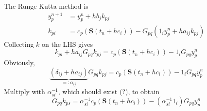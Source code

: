 \documentclass[paper=a4]{scrartcl}
\renewcommand{\vec}{\boldsymbol}
\begin{document}
The Runge-Kutta method is
\begin{align}
    y_p^{n+1} &= y_p^n + h b_j k_{pj} \\
    k_{pi} &= c_p(\vec{S}(t_n + hc_i)) - G_{pq} (1_iy_p^n + h a_{ij} k_{pj})
\end{align}
Collecting $k$ on the LHS gives
\begin{equation*}
    k_{pi} + h a_{ij} G_{pq} k_{pj} = c_p(\vec{S}(t_n + hc_i)) - 1_iG_{pq} y_p^n
\end{equation*}
Obviously,
\begin{equation*}
    \underbrace{(\delta_{ij} + h a_{ij})}_{=:\alpha_{ij}} G_{pq} k_{pj} = c_p(\vec{S}(t_n + hc_i)) - 1_iG_{pq} y_p^n
\end{equation*}
Multiply with $\alpha^{-1}_{si}$, which should exist (?), to obtain
\begin{equation*}
    G_{pq} k_{ps} = \alpha^{-1}_{si} c_p(\vec{S}(t_n + hc_i)) - (\alpha^{-1}_{si}1_i)G_{pq} y_p^n
\end{equation*}
\end{document}
